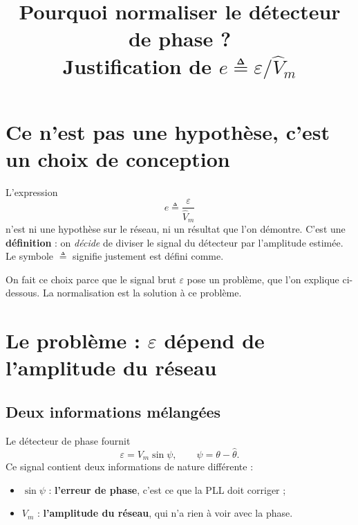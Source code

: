 \documentclass[11pt,a4paper]{article}
\title{\textbf{Pourquoi normaliser le détecteur de phase ?}\\[4pt]
\large Justification de $e \triangleq \varepsilon/\hat V_m$}
\date{}
\numberwithin{equation}{section}
\newcommand{\hth}{\hat{\theta}}
\begin{document}
\maketitle

\section{Ce n'est pas une hypothèse, c'est un choix de conception}

L'expression
\begin{equation}
e \triangleq \frac{\varepsilon}{\hat V_m}
\end{equation}
n'est ni une hypothèse sur le réseau, ni un résultat que l'on démontre.
C'est une \textbf{définition} : on \emph{décide} de diviser le signal du détecteur par l'amplitude estimée.
Le symbole $\triangleq$ signifie justement \og est défini comme\fg.

\begin{idee}
On fait ce choix parce que le signal brut $\varepsilon$ pose un problème, que l'on explique ci-dessous.
La normalisation est la solution à ce problème.
\end{idee}

\section{Le problème : $\varepsilon$ dépend de l'amplitude du réseau}

\subsection{Deux informations mélangées}
Le détecteur de phase fournit
\begin{equation}
\varepsilon = V_m\sin\psi,\qquad \psi = \theta-\hth .
\end{equation}
Ce signal contient deux informations de nature différente :
\begin{itemize}
  \item $\sin\psi$ : \textbf{l'erreur de phase}, c'est ce que la PLL doit corriger ;
  \item $V_m$ : \textbf{l'amplitude du réseau}, qui n'a rien à voir avec la phase.
\end{itemize}
\end{document}
